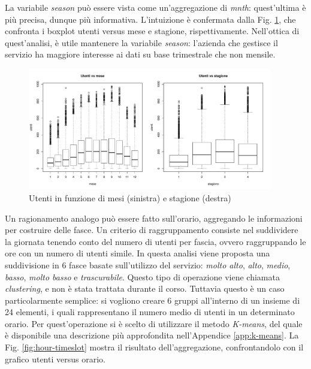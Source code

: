 \documentclass[a4paper, 10pt]{report}
\begin{document}
La variabile \emph{season} può essere vista come un'aggregazione di
\emph{mnth}: quest'ultima è più precisa, dunque più informativa.
L'intuizione è confermata dalla Fig. \ref{fig:month-season}, che confronta
i boxplot utenti versus mese e stagione, rispettivamente. Nell'ottica di
quest'analisi, è utile mantenere la variabile \emph{season}: l'azienda
che gestisce il servizio ha maggiore interesse ai dati su base trimestrale
che non mensile.

\begin{figure}
  \centering
  \includegraphics[width=0.95\textwidth]{../plots/month-season.pdf}
  \caption{Utenti in funzione di mesi (sinistra) e stagione (destra)}
  \label{fig:month-season}
\end{figure}

Un ragionamento analogo può essere fatto sull'orario, aggregando le
informazioni per costruire delle fasce. Un criterio di raggruppamento
consiste nel suddividere la giornata tenendo conto del numero di utenti
per fascia, ovvero raggruppando le ore con un numero di utenti simile.
In questa analisi viene proposta una suddivisione in 6 fasce basate
sull'utilizzo del servizio: \emph{molto alto}, \emph{alto}, \emph{medio},
\emph{basso}, \emph{molto basso} e \emph{trascurabile}. Questo tipo di
operazione viene chiamata \emph{clustering}, e non è stata trattata durante il
corso. Tuttavia questo è un caso particolarmente semplice: si vogliono
creare 6 gruppi all'interno di un insieme di 24 elementi, i quali
rappresentano il numero medio di utenti in un determinato orario. Per
quest'operazione si è scelto di utilizzare il metodo \emph{K-means},
del quale è disponibile una descrizione più approfondita nell'Appendice
\ref{app:k-means}. La Fig. \ref{fig:hour-timeslot} mostra il risultato
dell'aggregazione, confrontandolo con il grafico utenti versus orario.
\end{document}
